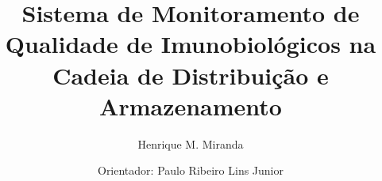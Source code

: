 \documentclass[t]{beamer}
\title{Sistema de Monitoramento de Qualidade de Imunobiológicos na Cadeia de Distribuição e Armazenamento}
\subtitle{Henrique M. Miranda}
\author{Orientador: Paulo Ribeiro Lins Junior}
\begin{document}
\frame[c]{\maketitle}


\begin{darkframes}


  
  
\end{darkframes}
\end{document}
